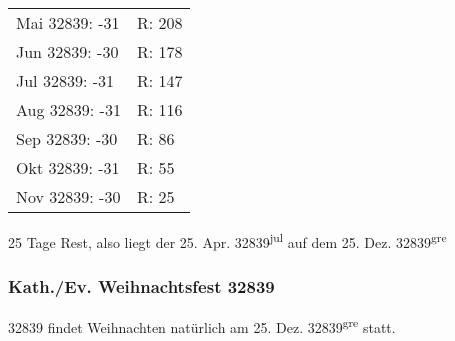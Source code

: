 			\begin{tabular}{ll}
				Mai 32839: -31 & R: 208 \\
				Jun 32839: -30 & R: 178 \\
				Jul 32839: -31 & R: 147 \\
				Aug 32839: -31 & R: 116 \\
				Sep 32839: -30 & R: 86  \\
				Okt 32839: -31 & R: 55  \\
				Nov 32839: -30 & R: 25 
			\end{tabular}

			25 Tage Rest, also liegt der 25. Apr. 32839\textsuperscript{jul} auf dem 25. Dez. 32839\textsuperscript{gre}
		\subsubsection{Kath./Ev. Weihnachtsfest 32839}
			32839 findet Weihnachten natürlich am 25. Dez. 32839\textsuperscript{gre} statt.

	\onecolumn